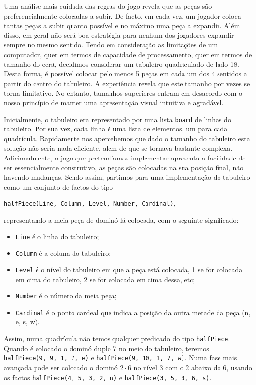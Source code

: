\documentclass[a4paper]{article}
\begin{document}
Uma análise mais cuidada das regras do jogo revela que as peças são preferencialmente colocadas a subir. De facto, em cada vez, um jogador coloca tantas peças a subir quanto possível e no máximo uma peça a expandir. Além disso, em geral não será boa estratégia para nenhum dos jogadores expandir sempre no mesmo sentido. Tendo em consideração as limitações de um computador, quer em termos de capacidade de processamento, quer em termos de tamanho do ecrã, decidimos considerar um tabuleiro quadriculado de lado 18. Desta forma, é possível colocar pelo menos 5 peças em cada um dos 4 sentidos a partir do centro do tabuleiro. A experiência revela que este tamanho por vezes se torna limitativo. No entanto, tamanhos superiores entram em desacordo com o nosso princípio de manter uma apresentação visual intuitiva e agradável.

Inicialmente, o tabuleiro era representado por uma lista \verb|board| de linhas do tabuleiro. Por sua vez, cada linha é uma lista de elementos, um para cada quadrícula. Rapidamente nos apercebemos que dado o tamanho do tabuleiro esta solução não seria nada eficiente, além de que se tornava bastante complexa. Adicionalmente, o jogo que pretendíamos implementar apresenta a facilidade de ser essencialmente construtivo, as peças são colocadas na sua posição final, não havendo mudanças. Sendo assim, partimos para uma implementação do tabuleiro como um conjunto de factos do tipo 
\begin{center}
	\verb|halfPiece(Line, Column, Level, Number, Cardinal)|,
\end{center} 
representando a meia peça de dominó lá colocada, com o seguinte significado:
\begin{itemize}
	\item \verb|Line| é o linha do tabuleiro;
	\item \verb|Column| é a coluna do tabuleiro;
	\item \verb|Level| é o nível do tabuleiro em que a peça está colocada, 1 se for colocada em cima do tabuleiro, 2 se for colocada em cima dessa, etc;
	\item \verb|Number| é o número da meia peça;
	\item \verb|Cardinal| é o ponto cardeal que indica a posição da outra metade da peça (n, e, s, w).
\end{itemize}
Assim, numa quadrícula não temos qualquer predicado do tipo \verb|halfPiece|. Quando é colocado o dominó duplo 7 no meio do tabuleiro, teremos \verb|halfPiece(9, 9, 1, 7, e)| e \verb|halfPiece(9, 10, 1, 7, w)|. Numa fase mais avançada pode ser colocado o dominó $2 \cdot 6$ no nível 3 com o 2 abaixo do 6, usando os factos \verb|halfPiece(4, 5, 3, 2, n)| e \verb|halfPiece(3, 5, 3, 6, s)|.
\end{document}
